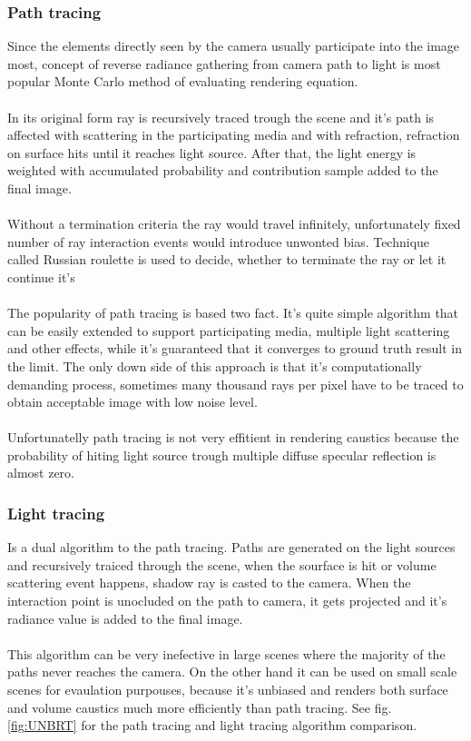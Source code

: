 \subsubsection{Path tracing}
Since the elements directly seen by the camera usually participate into the image most, concept of reverse radiance gathering from camera path to light is most popular Monte Carlo method of evaluating rendering equation. 
\\
\\
In its original form ray is recursively traced trough the scene and it's path is affected with scattering in the participating media and with refraction, refraction on surface hits until it reaches light source. After that, the light energy is weighted with accumulated probability and contribution sample added to the final image. 
\\
\\
Without a termination criteria the ray would travel infinitely, unfortunately fixed number of ray interaction events would introduce unwonted bias. Technique called Russian roulette is used to decide, whether to terminate the ray or let it continue it's
\\
\\
The popularity of path tracing is based two fact. It's quite simple algorithm that can be easily extended to support participating media, multiple light scattering and other effects, while it's guaranteed that it converges to ground truth result in the limit. The only down side of this approach is that it's computationally demanding process, sometimes many thousand rays per pixel have to be traced to obtain acceptable image with low noise level.
\\
\\
Unfortunatelly path tracing is not very effitient in rendering caustics because the probability of hiting light source trough multiple diffuse specular reflection is almost zero.




\subsubsection{Light tracing}
Is a dual algorithm to the path tracing. Paths are generated on the light sources and recursively traiced through the scene, when the sourface is hit or volume scattering event happens, shadow ray is casted to the camera. When the interaction point is unocluded on the path to camera, it gets projected and it's radiance value is added to the final image. 
\\
\\
This algorithm can be very inefective in large scenes where the majority of the paths never reaches the camera. On the other hand it can be used on small scale scenes for evaulation purpouses, because it's unbiased and renders both surface and volume caustics much more efficiently than path tracing. See fig. \ref{fig:UNBRT} for the path tracing and light tracing algorithm comparison.


